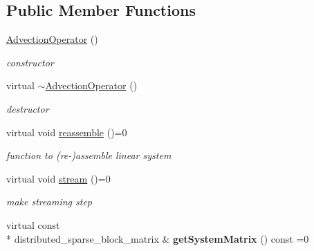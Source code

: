 \subsection*{Public Member Functions}
\begin{DoxyCompactItemize}
\item 
\hypertarget{classnatrium_1_1AdvectionOperator_a48d3a57e3433d9f6c3768ad2f392df56}{\hyperlink{classnatrium_1_1AdvectionOperator_a48d3a57e3433d9f6c3768ad2f392df56}{Advection\-Operator} ()}\label{classnatrium_1_1AdvectionOperator_a48d3a57e3433d9f6c3768ad2f392df56}

\begin{DoxyCompactList}\small\item\em constructor \end{DoxyCompactList}\item 
\hypertarget{classnatrium_1_1AdvectionOperator_a691156dace41e3075fd89953f30ae83f}{virtual \hyperlink{classnatrium_1_1AdvectionOperator_a691156dace41e3075fd89953f30ae83f}{$\sim$\-Advection\-Operator} ()}\label{classnatrium_1_1AdvectionOperator_a691156dace41e3075fd89953f30ae83f}

\begin{DoxyCompactList}\small\item\em destructor \end{DoxyCompactList}\item 
\hypertarget{classnatrium_1_1AdvectionOperator_a89c25c3dae9a1e5973cd89fab8c2c052}{virtual void \hyperlink{classnatrium_1_1AdvectionOperator_a89c25c3dae9a1e5973cd89fab8c2c052}{reassemble} ()=0}\label{classnatrium_1_1AdvectionOperator_a89c25c3dae9a1e5973cd89fab8c2c052}

\begin{DoxyCompactList}\small\item\em function to (re-\/)assemble linear system \end{DoxyCompactList}\item 
\hypertarget{classnatrium_1_1AdvectionOperator_aacdf6096f40166c5ec64686655c906a0}{virtual void \hyperlink{classnatrium_1_1AdvectionOperator_aacdf6096f40166c5ec64686655c906a0}{stream} ()=0}\label{classnatrium_1_1AdvectionOperator_aacdf6096f40166c5ec64686655c906a0}

\begin{DoxyCompactList}\small\item\em make streaming step \end{DoxyCompactList}\item 
\hypertarget{classnatrium_1_1AdvectionOperator_a2cbaee43740d976492e6c9d6d2b84ad0}{virtual const \\*
distributed\-\_\-sparse\-\_\-block\-\_\-matrix \& {\bfseries get\-System\-Matrix} () const =0}\label{classnatrium_1_1AdvectionOperator_a2cbaee43740d976492e6c9d6d2b84ad0}


\end{DoxyCompactItemize}
